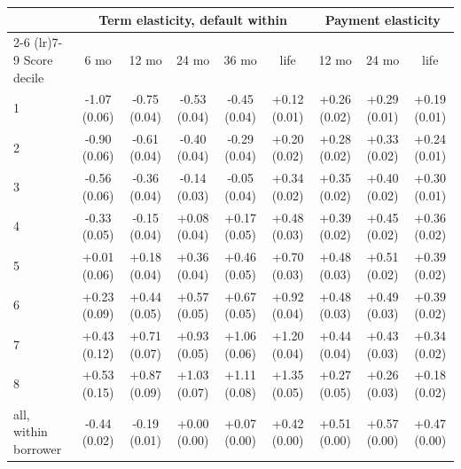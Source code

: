 \begin{tabular}{lcccccccc}
\toprule
 & \multicolumn{5}{c}{Term elasticity, default within} & \multicolumn{3}{c}{Payment elasticity} \\
\cmidrule(lr){2-6} \cmidrule(lr){7-9}
Score decile & 6 mo & 12 mo & 24 mo & 36 mo & life & 12 mo & 24 mo & life \\
\midrule
1 & -1.07 (0.06) & -0.75 (0.04) & -0.53 (0.04) & -0.45 (0.04) & +0.12 (0.01) & +0.26 (0.02) & +0.29 (0.01) & +0.19 (0.01) \\
2 & -0.90 (0.06) & -0.61 (0.04) & -0.40 (0.04) & -0.29 (0.04) & +0.20 (0.02) & +0.28 (0.02) & +0.33 (0.02) & +0.24 (0.01) \\
3 & -0.56 (0.06) & -0.36 (0.04) & -0.14 (0.03) & -0.05 (0.04) & +0.34 (0.02) & +0.35 (0.02) & +0.40 (0.02) & +0.30 (0.01) \\
4 & -0.33 (0.05) & -0.15 (0.04) & +0.08 (0.04) & +0.17 (0.05) & +0.48 (0.03) & +0.39 (0.02) & +0.45 (0.02) & +0.36 (0.02) \\
5 & +0.01 (0.06) & +0.18 (0.04) & +0.36 (0.04) & +0.46 (0.05) & +0.70 (0.03) & +0.48 (0.03) & +0.51 (0.02) & +0.39 (0.02) \\
6 & +0.23 (0.09) & +0.44 (0.05) & +0.57 (0.05) & +0.67 (0.05) & +0.92 (0.04) & +0.48 (0.03) & +0.49 (0.03) & +0.39 (0.02) \\
7 & +0.43 (0.12) & +0.71 (0.07) & +0.93 (0.05) & +1.06 (0.06) & +1.20 (0.04) & +0.44 (0.04) & +0.43 (0.03) & +0.34 (0.02) \\
8 & +0.53 (0.15) & +0.87 (0.09) & +1.03 (0.07) & +1.11 (0.08) & +1.35 (0.05) & +0.27 (0.05) & +0.26 (0.03) & +0.18 (0.02) \\
\midrule
all, within borrower & -0.44 (0.02) & -0.19 (0.01) & +0.00 (0.00) & +0.07 (0.00) & +0.42 (0.00) & +0.51 (0.00) & +0.57 (0.00) & +0.47 (0.00) \\
\bottomrule
\end{tabular}